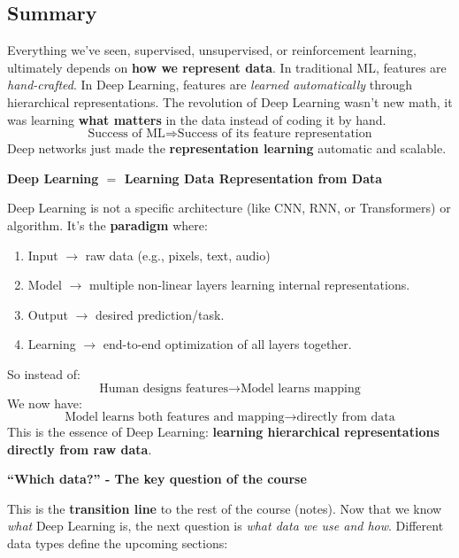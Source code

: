 \subsection{Summary}

Everything we've seen, supervised, unsupervised, or reinforcement learning, ultimately depends on \textbf{how we represent data}. In traditional ML, features are \emph{hand-crafted}. In Deep Learning, features are \emph{learned automatically} through hierarchical representations. The revolution of Deep Learning wasn't new math, it was learning \textbf{what matters} in the data instead of coding it by hand.
\begin{equation*}
    \text{Success of ML} \Rightarrow \text{Success of its feature representation}
\end{equation*}
Deep networks just made the \textbf{representation learning} automatic and scalable.

\highspace
\begin{flushleft}
    \textcolor{Green3}{ \textbf{Deep Learning $=$ Learning Data Representation from Data}}
\end{flushleft}
Deep Learning is not a specific architecture (like CNN, RNN, or Transformers) or algorithm. It's the \textbf{paradigm} where:
\begin{enumerate}
    \item Input $\to$ raw data (e.g., pixels, text, audio)
    \item Model $\to$ multiple non-linear layers learning internal representations.
    \item Output $\to$ desired prediction/task.
    \item Learning $\to$ end-to-end optimization of all layers together.
\end{enumerate}
So instead of:
\begin{equation*}
    \text{Human designs features} \to \text{Model learns mapping}
\end{equation*}
We now have:
\begin{equation*}
    \text{Model learns both features and mapping} \to \text{directly from data}
\end{equation*}
This is the essence of Deep Learning: \textbf{learning hierarchical representations directly from raw data}.

\highspace
\begin{flushleft}
    \textcolor{Green3}{ \textbf{``Which data?'' - The key question of the course}}
\end{flushleft}
This is the \textbf{transition line} to the rest of the course (notes). Now that we know \emph{what} Deep Learning is, the next question is \emph{what data we use and how}. Different data types define the upcoming sections:

